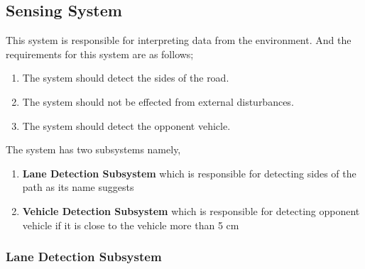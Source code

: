 \documentclass[a4paper,12pt]{article}
\begin{document}


\subsection{Sensing System}
	
	This system is responsible for interpreting data from the environment. And the requirements for this system are as follows;

	\begin{enumerate}
		\item The system should detect the sides of the road.
		\item The system should not be effected from external disturbances.
		\item The system should detect the opponent vehicle.
	\end{enumerate}	

	The system has two subsystems namely, 

	\begin{enumerate}
		\item \textbf{Lane Detection Subsystem} which is responsible for detecting sides of the path as its name suggests
		\item \textbf{Vehicle Detection Subsystem} which is responsible for detecting opponent vehicle if it is close to the vehicle more than 5 cm
	\end{enumerate}


\subsubsection{Lane Detection Subsystem}\label{sec:LaneDetectionSubsystem}
\end{document}
